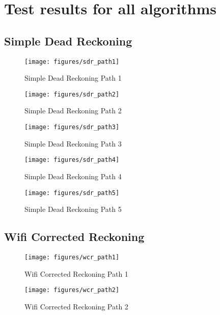 \chapter{Test results for all algorithms}

\section{Simple Dead Reckoning}

\begin{figure}
    \centering
    \texttt{[image: figures/sdr\_path1]}
    \caption{Simple Dead Reckoning Path 1\label{fig:sdr_path1}}
\end{figure}

\begin{figure}
    \centering
    \texttt{[image: figures/sdr\_path2]}
    \caption{Simple Dead Reckoning Path 2\label{fig:sdr_path2}}
\end{figure}

\begin{figure}
    \centering
    \texttt{[image: figures/sdr\_path3]}
    \caption{Simple Dead Reckoning Path 3\label{fig:sdr_path3}}
\end{figure}

\begin{figure}
    \centering
    \texttt{[image: figures/sdr\_path4]}
    \caption{Simple Dead Reckoning Path 4\label{fig:sdr_path4}}
\end{figure}

\begin{figure}
    \centering
    \texttt{[image: figures/sdr\_path5]}
    \caption{Simple Dead Reckoning Path 5\label{fig:sdr_path5}}
\end{figure}

\section{Wifi Corrected Reckoning}

\begin{figure}
    \centering
    \texttt{[image: figures/wcr\_path1]}
    \caption{Wifi Corrected Reckoning Path 1\label{fig:wcr_path1}}
\end{figure}

\begin{figure}
    \centering
    \texttt{[image: figures/wcr\_path2]}
    \caption{Wifi Corrected Reckoning Path 2\label{fig:wcr_path2}}
\end{figure}

